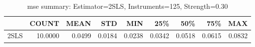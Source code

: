 \begin{table}[ht]
\centering
\caption{mse summary: Estimator=2SLS, Instruments=125, Strength=0.30}
\begin{tabular}{lrrrrrrrr}
\toprule
 & COUNT & MEAN & STD & MIN & 25\% & 50\% & 75\% & MAX \\
\midrule
2SLS & 10.0000 & 0.0499 & 0.0184 & 0.0238 & 0.0342 & 0.0518 & 0.0615 & 0.0832 \\
\bottomrule
\end{tabular}
\end{table}
